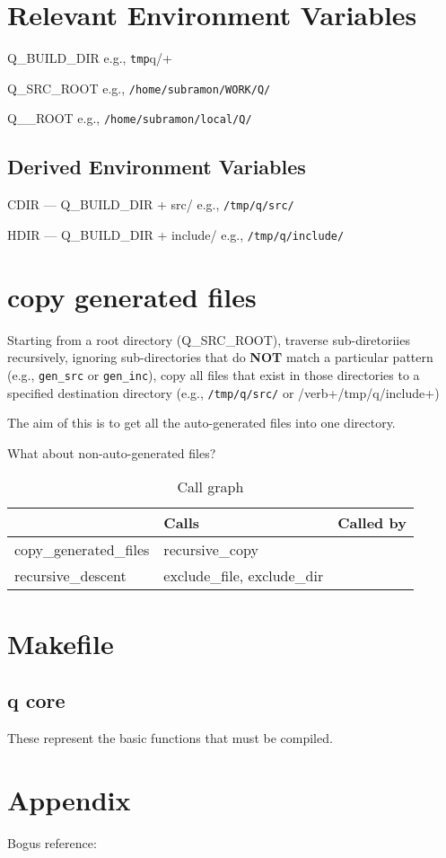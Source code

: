 
\section{Relevant Environment Variables}
\be
\item Q\_BUILD\_DIR e.g., \verb/tmp/q/+
\item Q\_SRC\_ROOT e.g., \verb+/home/subramon/WORK/Q/+
\item Q\__ROOT e.g., \verb+/home/subramon/local/Q/+
\ee

\subsection{Derived Environment Variables}
\be
\item CDIR --- Q\_BUILD\_DIR + \/src/ e.g., \verb+/tmp/q/src/+
\item HDIR --- Q\_BUILD\_DIR + \/include/ e.g., \verb+/tmp/q/include/+
\ee

\section{copy generated files}
\label{copy_generated_files}

Starting from a root directory (Q\_SRC\_ROOT), traverse sub-diretoriies
recursively, ignoring sub-directories that do {\bf NOT} match a particular
pattern (e.g., \verb+gen_src+ or \verb+gen_inc+), copy all files that exist in
those directories to a specified destination directory (e.g., \verb+/tmp/q/src/+
or /verb+/tmp/q/include+)

The aim of this is to get all the auto-generated files into one directory.

What about non-auto-generated files? \TBC

\begin{table}[hbtp]
\centering
\begin{tabular}{|l|l|l|} \hline \hline
                & {\bf Calls} & {\bf Called by} \\ \hline \hline
copy\_generated\_files & recursive\_copy & \\ \hline
recursive\_descent &  exclude\_file, exclude\_dir & \\ \hline
\hline
\end{tabular}
\caption{Call graph}
\label{tbl_call_graph}
\end{table}

\section{Makefile}

\subsection{q core}
\label{q_core}

These represent the basic functions that must be compiled.

\section{Appendix}

Bogus reference: \cite{sarawagi99}

 




